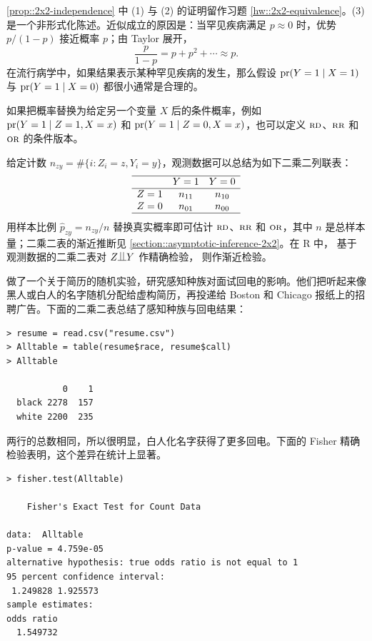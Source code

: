 \cref{prop::2x2-independence} 中 (1) 与 (2) 的证明留作习题 \cref{hw::2x2-equivalence}。(3) 是一个非形式化陈述。近似成立的原因是：当罕见疾病满足 $p\approx 0$ 时，优势 $p/(1-p)$ 接近概率 $p$；由 Taylor 展开，
\[
\frac{p}{1-p}=p+p^2+\cdots\approx p .
\]
在流行病学中，如果结果表示某种罕见疾病的发生，那么假设 $\textup{pr}(Y=1\mid X=1)$ 与 $\textup{pr}(Y=1\mid X=0)$ 都很小通常是合理的。

如果把概率替换为给定另一个变量 $X$ 后的条件概率，例如 $\textup{pr}(Y=1\mid Z=1,X=x)$ 和 $\textup{pr}(Y=1\mid Z=0,X=x)$，也可以定义 $\textsc{rd}$、$\textsc{rr}$ 和 $\textsc{or}$ 的条件版本。

给定计数 $n_{zy}=\#\{i:Z_i=z,Y_i=y\}$，观测数据可以总结为如下二乘二列联表：
\[
\begin{array}{lcc}
\hline
        & Y=1 & Y=0 \\\hline
Z=1 & n_{11} & n_{10}\\
Z=0 & n_{01} & n_{00}\\
\hline
\end{array}
\]
用样本比例 $\hat p_{zy}=n_{zy}/n$ 替换真实概率即可估计 $\textsc{rd}$、$\textsc{rr}$ 和 $\textsc{or}$，其中 $n$ 是总样本量；二乘二表的渐近推断见 \cref{section::asymptotic-inference-2x2}。在 R 中， 基于观测数据的二乘二表对 $Z\ind Y$ 作精确检验， 则作渐近检验。

\begin{example}\label{eg::bertrand2004emily-chapter1}
\citet{bertrand2004emily} 做了一个关于简历的随机实验，研究感知种族对面试回电的影响。他们把听起来像黑人或白人的名字随机分配给虚构简历，再投递给 Boston 和 Chicago 报纸上的招聘广告。下面的二乘二表总结了感知种族与回电结果：

\begin{lstlisting}
> resume = read.csv("resume.csv")
> Alltable = table(resume$race, resume$call)
> Alltable

           0    1
  black 2278  157
  white 2200  235
\end{lstlisting}

两行的总数相同，所以很明显，白人化名字获得了更多回电。下面的 Fisher 精确检验表明，这个差异在统计上显著。
\begin{lstlisting}
> fisher.test(Alltable)

	Fisher's Exact Test for Count Data

data:  Alltable
p-value = 4.759e-05
alternative hypothesis: true odds ratio is not equal to 1
95 percent confidence interval:
 1.249828 1.925573
sample estimates:
odds ratio
  1.549732
\end{lstlisting}
\end{example}


